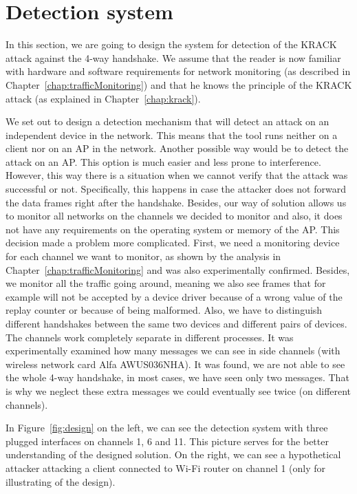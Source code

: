 \section{Detection system}
\label{sec:detectionSystem}

In this section, we are going to design the system for detection of the KRACK attack against the 4-way handshake. We assume that the reader is now familiar with hardware and software requirements for network monitoring (as described in Chapter~\ref{chap:trafficMonitoring}) and that he knows the principle of the KRACK attack (as explained in Chapter~\ref{chap:krack}).

We set out to design a detection mechanism that will detect an attack on an independent device in the network. This means that the tool runs neither on a client nor on an AP in the network. Another possible way would be to detect the attack on an AP. This option is much easier and less prone to interference. However, this way there is a situation when we cannot verify that the attack was successful or not. Specifically, this happens in case the attacker does not forward the data frames right after the handshake. Besides, our way of solution allows us to monitor all networks on the channels we decided to monitor and also, it does not have any requirements on the operating system or memory of the AP.
This decision made a problem more complicated. First, we need a monitoring device for each channel we want to monitor, as shown by the analysis in Chapter~\ref{chap:trafficMonitoring} and was also experimentally confirmed. Besides, we monitor all the traffic going around, meaning we also see frames that for example will not be accepted by a device driver because of a wrong value of the replay counter or because of being malformed. Also, we have to distinguish different handshakes between the same two devices and different pairs of devices. The channels work completely separate in different processes. It was experimentally examined how many messages we can see in side channels (with wireless network card Alfa AWUS036NHA). It was found, we are not able to see the whole 4-way handshake, in most cases, we have seen only two messages. That is why we neglect these extra messages we could eventually see twice (on different channels).

In Figure~\ref{fig:design} on the left, we can see the detection system with three plugged interfaces on channels 1, 6 and 11. This picture serves for the better understanding of the designed solution. On the right, we can see a hypothetical attacker attacking a client connected to Wi-Fi router on channel 1 (only for illustrating of the design).

